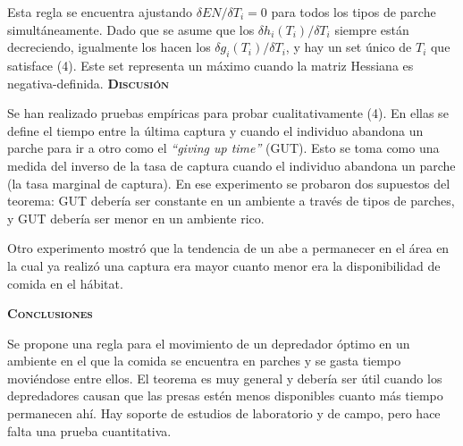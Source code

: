\documentclass[a4paper,12pt]{article}
\begin{document}
Esta regla se encuentra ajustando $\delta EN/\delta T_i = 0$ para todos los tipos de parche simultáneamente. Dado que se asume que los $\delta h_i(T_i)/\delta T_i$ siempre están decreciendo, igualmente los hacen los $\delta g_i(T_i)/\delta T_i$, y hay un set único de $T_i$ que satisface (4). Este set representa un máximo cuando la matriz Hessiana es negativa-definida. 
{\scshape\bfseries Discusión}

Se han realizado pruebas empíricas para probar cualitativamente (4). En ellas se define el tiempo entre la última captura y cuando el individuo abandona un parche para ir a otro como el {\itshape ``giving up time''} (GUT). Esto se toma como una medida del inverso de la tasa de captura cuando el individuo abandona un parche (la tasa marginal de captura). En ese experimento se probaron dos supuestos del teorema: GUT debería ser constante en un ambiente a través de tipos de parches, y GUT debería ser menor en un ambiente rico.

Otro experimento mostró que la tendencia de un abe a permanecer en el área en la cual ya realizó una captura era mayor cuanto menor era la disponibilidad de comida en el hábitat. 

{\scshape\bfseries Conclusiones}

Se propone una regla para el movimiento de un depredador óptimo en un ambiente en el que la comida se encuentra en parches y se gasta tiempo moviéndose entre ellos. El teorema es muy general y debería ser útil cuando los depredadores causan que las presas estén menos disponibles cuanto más tiempo permanecen ahí. Hay soporte de estudios de laboratorio y de campo, pero hace falta una prueba cuantitativa. 
\end{document}
